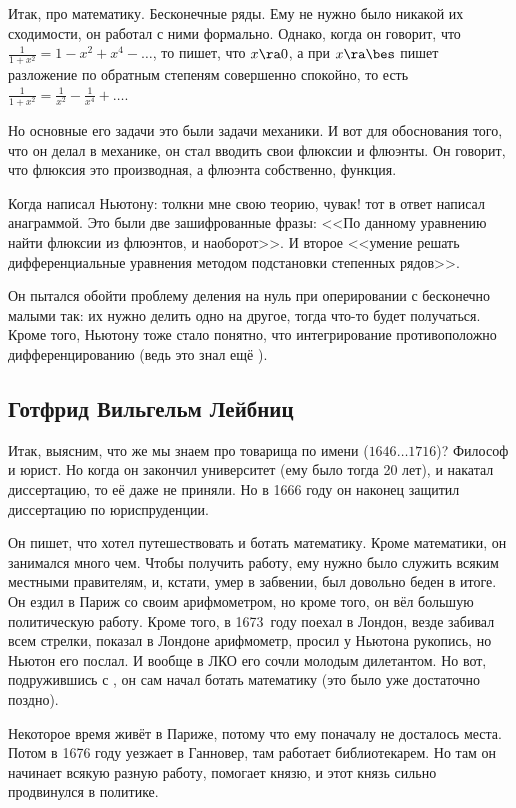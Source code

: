 \documentclass[a4paper,oneside,fleqn,10pt]{article}
\newcommand{\pe}[2]{${#1}\ldots{#2}$}
\begin{document}
Итак, про математику. Бесконечные ряды. Ему не нужно было никакой их сходимости, он работал
с ними формально. Однако, когда он говорит, что $\frac{1}{1+x^2} = 1 - x^2 + x^4-\dots$,
то пишет, что $x \ra 0$, а при $x \ra \bes$ пишет разложение по обратным степеням
совершенно спокойно, то есть $\frac{1}{1+x^2} = \frac{1}{x^2} - \frac{1}{x^4} + \dots$.

Но основные его задачи это были задачи механики. И вот для обоснования того,
что он делал в механике, он стал вводить свои флюксии и флюэнты.
Он говорит, что флюксия это производная, а флюэнта собственно, функция.

Когда  написал Ньютону: толкни мне свою теорию, чувак! тот в ответ написал анаграммой.
Это были две зашифрованные фразы: <<По данному уравнению найти флюксии из флюэнтов, и наоборот>>.
И второе <<умение решать дифференциальные уравнения методом подстановки степенных рядов>>.

Он пытался обойти проблему деления на нуль при оперировании с бесконечно малыми
так: их нужно делить одно на другое, тогда что-то будет
получаться. Кроме того, Ньютону тоже стало понятно, что интегрирование противоположно
дифференцированию (ведь это знал ещё ).

\subsection{Готфрид Вильгельм Лейбниц}

Итак, выясним, что же мы знаем про товарища по имени  (\pe{1646}{1716})?
Философ и юрист. Но когда он закончил университет (ему было тогда 20 лет),
и накатал диссертацию, то её даже не приняли. Но в 1666 году он наконец
защитил диссертацию по юриспруденции.

Он пишет, что хотел путешествовать и ботать математику. Кроме математики,
он занимался много чем. Чтобы получить работу, ему нужно было служить всяким
местными правителям, и, кстати, умер в забвении, был довольно беден в итоге.
Он ездил в Париж со своим арифмометром, но кроме того, он вёл большую политическую
работу. Кроме того, в 1673~году поехал в Лондон, везде забивал всем стрелки,
показал в Лондоне арифмометр, просил у Ньютона рукопись, но Ньютон его послал.
И вообще в ЛКО его сочли молодым дилетантом. Но вот, подружившись с ,
он сам начал ботать математику (это было уже достаточно поздно).

Некоторое время живёт в Париже, потому что ему поначалу не досталось места.
Потом в 1676 году уезжает в Ганновер, там работает библиотекарем.
Но там он начинает всякую разную работу, помогает князю, и этот князь
сильно продвинулся в политике.
\end{document}
